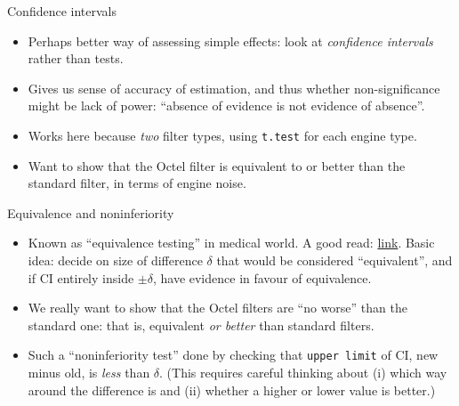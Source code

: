 \documentclass[
  ignorenonframetext,
]{beamer}
\begin{document}
\begin{frame}[fragile]{Confidence intervals}
\protect\hypertarget{confidence-intervals}{}

\begin{itemize}
\item
  Perhaps better way of assessing simple effects: look at
  \emph{confidence intervals} rather than tests.
\item
  Gives us sense of accuracy of estimation, and thus whether
  non-significance might be lack of power: ``absence of evidence is not
  evidence of absence''.
\item
  Works here because \emph{two} filter types, using \texttt{t.test} for
  each engine type.
\item
  Want to show that the Octel filter is equivalent to or better than the
  standard filter, in terms of engine noise.
\end{itemize}

\end{frame}

\begin{frame}[fragile]{Equivalence and noninferiority}
\protect\hypertarget{equivalence-and-noninferiority}{}

\begin{itemize}
\item
  Known as ``equivalence testing'' in medical world. A good read:
  \href{http://www.ncbi.nlm.nih.gov/pmc/articles/PMC3019319/}{link}.
  Basic idea: decide on size of difference \(\delta\) that would be
  considered ``equivalent'', and if CI entirely inside \(\pm \delta\),
  have evidence in favour of equivalence.
\item
  We really want to show that the Octel filters are ``no worse'' than
  the standard one: that is, equivalent \emph{or better} than standard
  filters.
\item
  Such a ``noninferiority test'' done by checking that
  \texttt{upper\ limit} of CI, new minus old, is \emph{less} than
  \(\delta\). (This requires careful thinking about (i) which way around
  the difference is and (ii) whether a higher or lower value is better.)
\end{itemize}

\end{frame}
\end{document}
